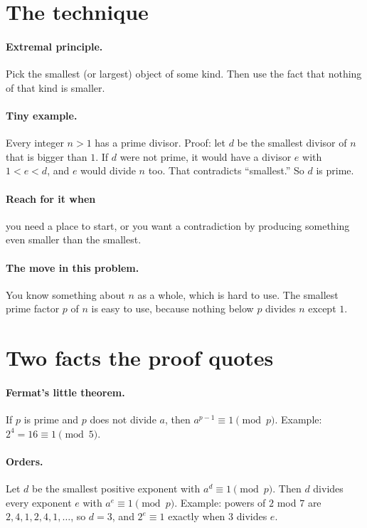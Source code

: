 \documentclass[11pt]{article}
\begin{document}

\section*{The technique}

\paragraph{Extremal principle.} Pick the smallest (or largest) object of some kind. Then use the fact that nothing of that kind is smaller.

\paragraph{Tiny example.} Every integer $n > 1$ has a prime divisor. Proof: let $d$ be the smallest divisor of $n$ that is bigger than $1$. If $d$ were not prime, it would have a divisor $e$ with $1 < e < d$, and $e$ would divide $n$ too. That contradicts ``smallest.'' So $d$ is prime.

\paragraph{Reach for it when} you need a place to start, or you want a contradiction by producing something even smaller than the smallest.

\paragraph{The move in this problem.} You know something about $n$ as a whole, which is hard to use. The smallest prime factor $p$ of $n$ is easy to use, because nothing below $p$ divides $n$ except $1$.

\section*{Two facts the proof quotes}

\paragraph{Fermat's little theorem.} If $p$ is prime and $p$ does not divide $a$, then $a^{p-1} \equiv 1 \pmod p$. Example: $2^4 = 16 \equiv 1 \pmod 5$.

\paragraph{Orders.} Let $d$ be the smallest positive exponent with $a^d \equiv 1 \pmod p$. Then $d$ divides every exponent $e$ with $a^e \equiv 1 \pmod p$. Example: powers of $2$ mod $7$ are $2, 4, 1, 2, 4, 1, \dots$, so $d = 3$, and $2^e \equiv 1$ exactly when $3$ divides $e$.
\end{document}
